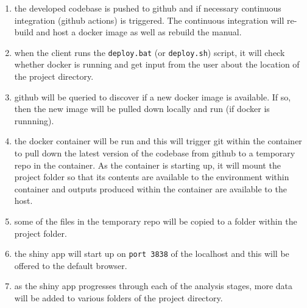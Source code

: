 \documentclass[
  8pt,
  a4paper]{article}
\providecommand{\tightlist}{%
  \setlength{\itemsep}{0pt}\setlength{\parskip}{0pt}}
\begin{document}
\begin{enumerate}
\def\labelenumi{\arabic{enumi}.}
\tightlist
\item
  the developed codebase is pushed to github and if necessary continuous
  integration (github actions) is triggered. The continuous integration
  will re-build and host a docker image as well as rebuild the manual.
\item
  when the client runs the \texttt{deploy.bat} (or \texttt{deploy.sh})
  script, it will check whether docker is running and get input from the
  user about the location of the project directory.
\item
  github will be queried to discover if a new docker image is available.
  If so, then the new image will be pulled down locally and run (if
  docker is runnning).
\item
  the docker container will be run and this will trigger git within the
  container to pull down the latest version of the codebase from github
  to a temporary repo in the container. As the container is starting up,
  it will mount the project folder so that its contents are available to
  the environment within container and outputs produced within the
  container are available to the host.
\item
  some of the files in the temporary repo will be copied to a folder
  within the project folder.
\item
  the shiny app will start up on \texttt{port\ 3838} of the localhost
  and this will be offered to the default browser.
\item
  as the shiny app progresses through each of the analysis stages, more
  data will be added to various folders of the project directory.
\end{enumerate}
\end{document}
